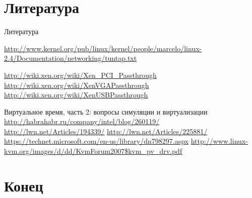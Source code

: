 \section{Литература}

\begin{frame}[allowframebreaks]{Литература}
\begin{thebibliography}{99}
      \url{http://www.kernel.org/pub/linux/kernel/people/marcelo/linux-2.4/Documentation/networking/tuntap.txt}

     \url{http://wiki.xen.org/wiki/Xen_PCI_Passthrough}
        \url{http://wiki.xen.org/wiki/XenVGAPassthrough}
        \url{http://wiki.xen.org/wiki/XenUSBPassthrough}

     Виртуальное время, часть 2: вопросы симуляции и виртуализации \url{http://habrahabr.ru/company/intel/blog/260119/}
     \url{http://lwn.net/Articles/194339/}
     \url{http://lwn.net/Articles/225881/}
     \url{https://technet.microsoft.com/en-us/library/dn798297.aspx}
     \url{http://www.linux-kvm.org/images/d/dd/KvmForum2007$kvm_pv_drv.pdf}
\end{thebibliography}
\end{frame}


\section{Конец}

\finalslide


